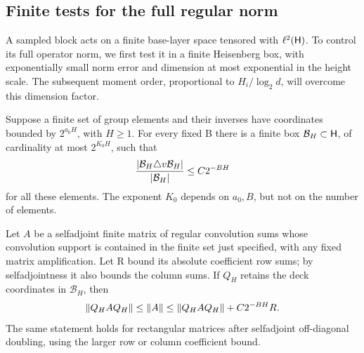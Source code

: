 \subsection{Finite tests for the full regular norm}

A sampled block acts on a finite base-layer space tensored with
\(\ell^2(\mathsf H)\).  To control its full operator norm, we first test it in a
finite Heisenberg box, with exponentially small norm error and dimension at
most exponential in the height scale.  The subsequent moment order,
proportional to \(H_i/\log_2 d\), will overcome this dimension factor.

\begin{lemma}
\label{lem:heisenberg-folner-test}
Suppose a finite set of group elements and their inverses have coordinates
bounded by \(2^{a_0H}\), with \(H\geq1\).  For every fixed B there is a finite
box \(\mathcal B_H\subset\mathsf H\), of cardinality at most \(2^{K_0H}\), such that
\[
 \frac{\left\lvert\mathcal B_H\triangle v\mathcal B_H\right\rvert}
      {\left\lvert\mathcal B_H\right\rvert}\leq C2^{-BH}
\]
for all these elements.  The exponent \(K_0\) depends on \(a_0,B\), but not
on the number of elements.

Let $A$ be a selfadjoint finite matrix of regular convolution sums whose
convolution support is contained in the finite set just specified, with any
fixed matrix amplification.  Let R bound its absolute coefficient row sums;
by selfadjointness it also bounds the column sums.  If \(Q_H\) retains the
deck coordinates in \(\mathcal B_H\), then
\begin{equation}
\label{eq:full-regular-norm-test}
 \left\lVert Q_HAQ_H\right\rVert\leq\left\lVert A\right\rVert
 \leq\left\lVert Q_HAQ_H\right\rVert+C2^{-BH}R.
\end{equation}
The same statement holds for rectangular matrices after selfadjoint
off-diagonal doubling, using the larger row or column coefficient bound.
\end{lemma}

